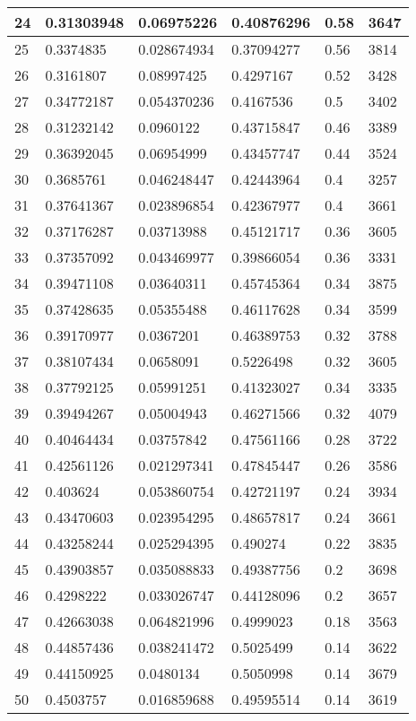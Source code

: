 \begin{longtable}{|l|l|l|l|l|l|}
24 & 0.31303948 & 0.06975226 & 0.40876296 & 0.58 & 3647 \\ \hline 
25 & 0.3374835 & 0.028674934 & 0.37094277 & 0.56 & 3814 \\ \hline 
26 & 0.3161807 & 0.08997425 & 0.4297167 & 0.52 & 3428 \\ \hline 
27 & 0.34772187 & 0.054370236 & 0.4167536 & 0.5 & 3402 \\ \hline 
28 & 0.31232142 & 0.0960122 & 0.43715847 & 0.46 & 3389 \\ \hline 
29 & 0.36392045 & 0.06954999 & 0.43457747 & 0.44 & 3524 \\ \hline 
30 & 0.3685761 & 0.046248447 & 0.42443964 & 0.4 & 3257 \\ \hline 
31 & 0.37641367 & 0.023896854 & 0.42367977 & 0.4 & 3661 \\ \hline 
32 & 0.37176287 & 0.03713988 & 0.45121717 & 0.36 & 3605 \\ \hline 
33 & 0.37357092 & 0.043469977 & 0.39866054 & 0.36 & 3331 \\ \hline 
34 & 0.39471108 & 0.03640311 & 0.45745364 & 0.34 & 3875 \\ \hline 
35 & 0.37428635 & 0.05355488 & 0.46117628 & 0.34 & 3599 \\ \hline 
36 & 0.39170977 & 0.0367201 & 0.46389753 & 0.32 & 3788 \\ \hline 
37 & 0.38107434 & 0.0658091 & 0.5226498 & 0.32 & 3605 \\ \hline 
38 & 0.37792125 & 0.05991251 & 0.41323027 & 0.34 & 3335 \\ \hline 
39 & 0.39494267 & 0.05004943 & 0.46271566 & 0.32 & 4079 \\ \hline 
40 & 0.40464434 & 0.03757842 & 0.47561166 & 0.28 & 3722 \\ \hline 
41 & 0.42561126 & 0.021297341 & 0.47845447 & 0.26 & 3586 \\ \hline 
42 & 0.403624 & 0.053860754 & 0.42721197 & 0.24 & 3934 \\ \hline 
43 & 0.43470603 & 0.023954295 & 0.48657817 & 0.24 & 3661 \\ \hline 
44 & 0.43258244 & 0.025294395 & 0.490274 & 0.22 & 3835 \\ \hline 
45 & 0.43903857 & 0.035088833 & 0.49387756 & 0.2 & 3698 \\ \hline 
46 & 0.4298222 & 0.033026747 & 0.44128096 & 0.2 & 3657 \\ \hline 
47 & 0.42663038 & 0.064821996 & 0.4999023 & 0.18 & 3563 \\ \hline 
48 & 0.44857436 & 0.038241472 & 0.5025499 & 0.14 & 3622 \\ \hline 
49 & 0.44150925 & 0.0480134 & 0.5050998 & 0.14 & 3679 \\ \hline 
50 & 0.4503757 & 0.016859688 & 0.49595514 & 0.14 & 3619 \\ \hline 
\end{longtable}